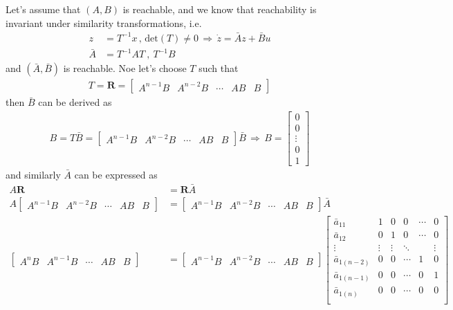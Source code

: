 \documentclass[twoside]{article}
\begin{document}
Let's assume that $(A,B)$ is reachable, and we know that reachability is invariant under similarity transformations, i.e.
%
\begin{align*}
	z &= T^{-1} x \, , \, \mathrm{det}(T) \neq 0 \, \Rightarrow \, \dot{z} = \bar{A} z + \bar{B} u \\
	\bar{A} &= T^{-1} A T \ , \ T^{-1} B 
\end{align*}
%
and $(\bar{A}, \bar{B})$ is reachable. Noe let's choose $T$ such that
%
\begin{align*}
T = \mathbf{R} = \left[ \begin{array}{c|c|c|c|c} A^{n-1} B & A^{n-2} B & \cdots & A B &  B \end{array} \right]
\end{align*}
%
then $\bar{B}$ can be derived as
% 
\begin{align*}
B = T \bar{B} = \left[ \begin{array}{c|c|c|c|c} A^{n-1} B & A^{n-2} B & \cdots & A B &  B \end{array} \right] \bar{B} 
\, \Rightarrow \, B = \begin{bmatrix} 0 \\ 0 \\ \vdots \\ 0 \\ 1 \end{bmatrix}
\end{align*}
%
and similarly $\bar{A}$ can be expressed as
\begin{align*}
A \mathbf{R} &= \mathbf{R} \bar{A}
\\
A \left[ \begin{array}{c|c|c|c|c} A^{n-1} B & A^{n-2} B & \cdots & A B &  B \end{array} \right] &= \left[ \begin{array}{c|c|c|c|c} A^{n-1} B & A^{n-2} B & \cdots & A B &  B \end{array} \right] \bar{A}
\\
\left[ \begin{array}{c|c|c|c|c} A^{n} B & A^{n-1} B & \cdots & A B &  B \end{array} \right] &= \left[ \begin{array}{c|c|c|c|c} A^{n-1} B & A^{n-2} B & \cdots & A B &  B \end{array} \right] \left[ \begin{array}{c|c|c|c|c|c} 
\bar{a}_{11} & 1 & 0 & 0 & \cdots & 0 \\
\bar{a}_{12} & 0 & 1 &  0 & \cdots & 0 \\
\vdots & \vdots & \vdots & \ddots &  & \vdots \\
\bar{a}_{1(n-2)} & 0 & 0 & \cdots  & 1 & 0 \\
\bar{a}_{1(n-1)} & 0 & 0 & \cdots  & 0 & 1 \\
\bar{a}_{1(n)} & 0 & 0 & \cdots  & 0 & 0 \\
\end{array} 
\right] 
\end{align*}
\end{document}
